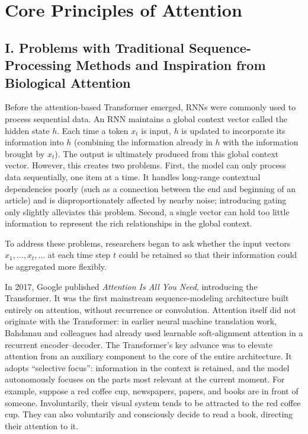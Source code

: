 \setcounter{section}{0}

\hypertarget{core-principles-of-attention}{%
\section{Core Principles of Attention}\label{core-principles-of-attention}}

\hypertarget{i.-problems-with-traditional-sequence-processing-methods-and-inspiration-from-biological-attention}{%
\subsection{I. Problems with Traditional Sequence-Processing Methods and Inspiration from Biological Attention}\label{i.-problems-with-traditional-sequence-processing-methods-and-inspiration-from-biological-attention}}

Before the attention-based Transformer emerged, RNNs were commonly used to process sequential data. An RNN maintains a global context vector called the hidden state \(h\). Each time a token \(x_t\) is input, \(h\) is updated to incorporate its information into \(h\) (combining the information already in \(h\) with the information brought by \(x_t\)). The output is ultimately produced from this global context vector. However, this creates two problems. First, the model can only process data sequentially, one item at a time. It handles long-range contextual dependencies poorly (such as a connection between the end and beginning of an article) and is disproportionately affected by nearby noise; introducing gating only slightly alleviates this problem. Second, a single vector can hold too little information to represent the rich relationships in the global context.

To address these problems, researchers began to ask whether the input vectors \(x_1,\ldots,x_t,\ldots\) at each time step \(t\) could be retained so that their information could be aggregated more flexibly.

In 2017, Google published \emph{Attention Is All You Need}, introducing the Transformer. It was the first mainstream sequence-modeling architecture built entirely on attention, without recurrence or convolution. Attention itself did not originate with the Transformer: in earlier neural machine translation work, Bahdanau and colleagues had already used learnable soft-alignment attention in a recurrent encoder--decoder. The Transformer's key advance was to elevate attention from an auxiliary component to the core of the entire architecture. It adopts ``selective focus'': information in the context is retained, and the model autonomously focuses on the parts most relevant at the current moment. For example, suppose a red coffee cup, newspapers, papers, and books are in front of someone. Involuntarily, their visual system tends to be attracted to the red coffee cup. They can also voluntarily and consciously decide to read a book, directing their attention to it.

